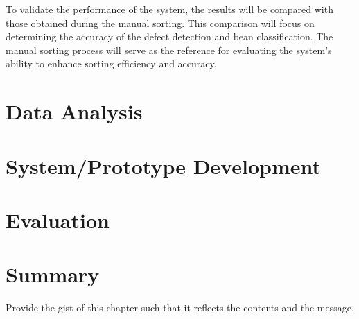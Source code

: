 	To validate the performance of the system, the results will be compared with those obtained during the manual sorting. This comparison will focus on determining the accuracy of the defect detection and bean classification. The manual sorting process will serve as the reference for evaluating the system’s ability to enhance sorting efficiency and accuracy.

\section{Data Analysis}
\section{System/Prototype Development} %
\section{Evaluation} %
\section{Summary}

Provide the gist of this chapter such that it reflects the contents and the message.
